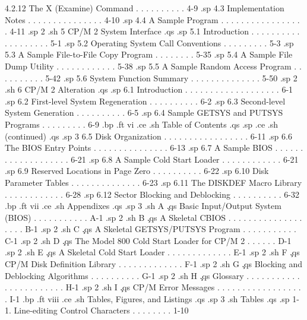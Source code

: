         4.2.12 The X (Examine) Command  . . . . . . . . . .   4-9
.sp
   4.3  Implementation Notes  . . . . . . . . . . . . . . .  4-10
.sp
   4.4  A Sample Program  . . . . . . . . . . . . . . . . .  4-11
.sp 2
.sh
5  CP/M 2 System Interface
.qs
.sp
   5.1  Introduction  . . . . . . . . . . . . . . . . . . .   5-1
.sp
   5.2  Operating System Call Conventions . . . . . . . . .   5-3
.sp
   5.3  A Sample File-to-File Copy Program  . . . . . . . .  5-35
.sp
   5.4  A Sample File Dump Utility  . . . . . . . . . . . .  5-38
.sp
   5.5  A Sample Random Access Program  . . . . . . . . . .  5-42
.sp
   5.6  System Function Summary . . . . . . . . . . . . . .  5-50
.sp 2
.sh
6  CP/M 2 Alteration
.qs
.sp
   6.1  Introduction  . . . . . . . . . . . . . . . . . . .   6-1
.sp
   6.2  First-level System Regeneration . . . . . . . . . .   6-2
.sp
   6.3  Second-level System Generation  . . . . . . . . . .   6-5
.sp
   6.4  Sample GETSYS and PUTSYS Programs . . . . . . . . .   6-9
.bp
.ft                                vi
.ce
.sh
Table of Contents
.qs
.sp
.ce
.sh
(continued)
.qs
.sp 3
   6.5  Disk Organization . . . . . . . . . . . . . . . . .  6-11
.sp
   6.6  The BIOS Entry Points . . . . . . . . . . . . . . .  6-13
.sp
   6.7  A Sample BIOS . . . . . . . . . . . . . . . . . . .  6-21
.sp
   6.8  A Sample Cold Start Loader  . . . . . . . . . . . .  6-21
.sp
   6.9  Reserved Locations in Page Zero . . . . . . . . . .  6-22
.sp
   6.10  Disk Parameter Tables  . . . . . . . . . . . . . .  6-23
.sp
   6.11  The DISKDEF Macro Library  . . . . . . . . . . . .  6-28
.sp
   6.12  Sector Blocking and Deblocking . . . . . . . . . .  6-32
.bp
.ft                                vii
.ce
.sh
Appendixes
.qs
.sp 3
.sh
A  \c
.qs
Basic Input/Output System (BIOS)  . . . . . . . . . . .   A-1
.sp 2
.sh
B  \c
.qs
A Skeletal CBIOS  . . . . . . . . . . . . . . . . . . .   B-1
.sp 2
.sh
C  \c
.qs
A Skeletal GETSYS/PUTSYS Program  . . . . . . . . . . .   C-1
.sp 2
.sh
D  \c
.qs
The Model 800 Cold Start Loader for CP/M 2  . . . . . .   D-1
.sp 2
.sh
E  \c
.qs
A Skeletal Cold Start Loader  . . . . . . . . . . . . .   E-1
.sp 2
.sh
F  \c
.qs
CP/M Disk Definition Library  . . . . . . . . . . . . .   F-1
.sp 2
.sh
G  \c
.qs
Blocking and Deblocking Algorithms  . . . . . . . . . .   G-1
.sp 2
.sh
H  \c
.qs
Glossary  . . . . . . . . . . . . . . . . . . . . . . .   H-1
.sp 2
.sh
I  \c
.qs
CP/M Error Messages . . . . . . . . . . . . . . . . . .   I-1
.bp
.ft                                viii
.ce
.sh
Tables, Figures, and Listings
.qs
.sp 3
.sh
Tables
.qs
.sp
     1-1.   Line-editing Control Characters . . . . . . . .  1-10
